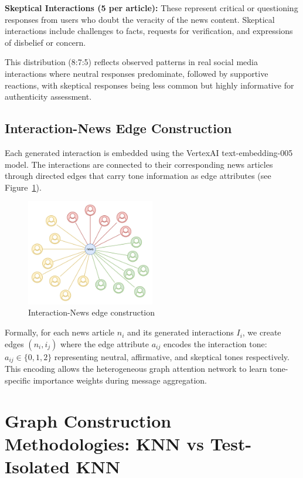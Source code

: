 \textbf{Skeptical Interactions (5 per article):} These represent critical or questioning responses from users who doubt the veracity of the news content. Skeptical interactions include challenges to facts, requests for verification, and expressions of disbelief or concern.

This distribution (8:7:5) reflects observed patterns in real social media interactions where neutral responses predominate, followed by supportive reactions, with skeptical responses being less common but highly informative for authenticity assessment.

\subsection{Interaction-News Edge Construction}

Each generated interaction is embedded using the VertexAI text-embedding-005 model. The interactions are connected to their corresponding news articles through directed edges that carry tone information as edge attributes (see Figure~\ref{fig:news_interaction_node}).

\begin{figure}[h]
    \centering
    \includegraphics[width=0.5\textwidth]{context/methodology/fig/news_interaction_node.png}
    \caption{Interaction-News edge construction}
    \label{fig:news_interaction_node}
\end{figure}

Formally, for each news article $n_i$ and its generated interactions $I_i$, we create edges $(n_i, i_j)$ where the edge attribute $a_{ij}$ encodes the interaction tone: $a_{ij} \in \{0, 1, 2\}$ representing neutral, affirmative, and skeptical tones respectively. This encoding allows the heterogeneous graph attention network to learn tone-specific importance weights during message aggregation.

\section{Graph Construction Methodologies: KNN vs Test-Isolated KNN}

